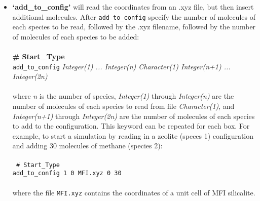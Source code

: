 \begin{itemize}
\item {\textbf{`add\_to\_config'}} will read the coordinates from an .xyz file, but then insert additional molecules.
After {\tt add\_to\_config} specify the number of molecules of each species to be read, followed by the .xyz filename, 
followed by the number of molecules of each species to be added: \\ \\
%
{\bf \# Start\_Type} \\
{\tt add\_to\_config} {\it Integer(1) ... Integer(n) Character(1) Integer(n+1) ... Integer(2n)}\\ \\
%
where {\it n} is the number of species, {\it Integer(1)} through {\it Integer(n)} are the number of molecules of each
species to read from file {\it Character(1)}, and {\it Integer(n+1)} through {\it Integer(2n)} are the number of molecules
of each species to add to the configuration.
This keyword can be repeated for each box.
For example, to start a simulation by reading in a zeolite (speces 1) configuration and adding 30 molecules of methane (species 2): \\ \\
%
\texttt{
\# Start\_Type \\
add\_to\_config  1  0 MFI.xyz 0 30 \\} \\
%
where the file \texttt{MFI.xyz} contains the coordinates of a unit cell of MFI silicalite.


\end{itemize}
